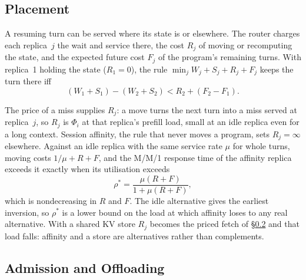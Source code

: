 \documentclass{article}
\newcommand{\leanref}[1]{}
\newcommand{\provedby}[1]{}
\theoremstyle{plain}
\theoremstyle{definition}
\theoremstyle{remark}
\begin{document}
\subsection{Placement}\label{sec:routing}

A resuming turn can be served where its state is or elsewhere. The
router charges each replica~$j$ the wait and service there, the cost
$R_j$ of moving or recomputing the state, and the expected future cost
$F_j$ of the program's remaining turns. With replica~1 holding the
state ($R_1=0$), the rule $\min_j W_j+S_j+R_j+F_j$ keeps the turn
there iff
\begin{equation}\label{eq:lookahead}
  (W_1+S_1)-(W_2+S_2) < R_2+(F_2-F_1).
\end{equation}
\provedby{\leanref{lookahead\_prefers\_iff}}
The price of a miss supplies $R_j$: a move turns the next turn into a
miss served at replica~$j$, so $R_j$ is $\Phi_i$ at that replica's
prefill load, small at an idle replica even for a long context.
Session affinity, the rule that never moves a program, sets
$R_j=\infty$ elsewhere. Against an idle replica with the same service
rate $\mu$ for whole turns, moving costs $1/\mu+R+F$, and the M/M/1
response time of
the affinity replica exceeds it exactly when its utilisation exceeds
\begin{equation}\label{eq:rhostar}
  \rho^*=\frac{\mu(R+F)}{1+\mu(R+F)},
\end{equation}
which is nondecreasing in $R$ and
$F$.\provedby{\leanref{affinity\_loses\_iff}, \leanref{inversionLoad\_stable}, \leanref{inversionLoad\_utilization}, \leanref{inversionLoad\_mono}, \leanref{affinity\_not\_always\_optimal}, \leanref{mm1Wait\_unbounded}, \leanref{inversionLoad\_examples}}
The idle alternative gives the earliest inversion, so $\rho^*$ is a
lower bound on the load at which affinity loses to any real
alternative. With a shared KV store $R_j$ becomes the priced fetch of
\S\ref{sec:admission} and that load falls: affinity and a store are
alternatives rather than complements.

\subsection{Admission and Offloading}\label{sec:admission}
\end{document}
